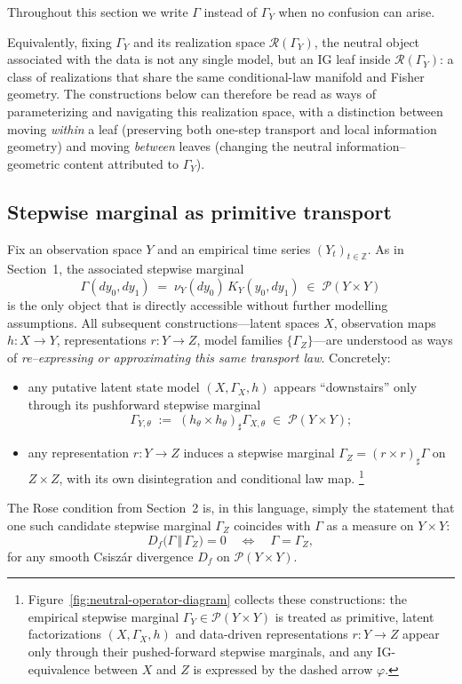 \documentclass[11pt]{article}
\newcommand{\1}{\mathbf{1}}
\begin{document}
Throughout this section we write \(\Gamma\) instead of \(\Gamma_Y\) when no confusion can arise.

Equivalently, fixing $\Gamma_Y$ and its realization space $\mathcal{R}(\Gamma_Y)$, the neutral object associated with the data is not any single model, but an IG leaf inside $\mathcal{R}(\Gamma_Y)$: a class of realizations that share the same conditional-law manifold and Fisher geometry. The constructions below can therefore be read as ways of parameterizing and navigating this realization space, with a distinction between moving \emph{within} a leaf (preserving both one-step transport and local information geometry) and moving \emph{between} leaves (changing the neutral information–geometric content attributed to $\Gamma_Y$).

\subsection{Stepwise marginal as primitive transport}

Fix an observation space \(Y\) and an empirical time series \((Y_t)_{t \in \mathbb{Z}}\). As in Section~1, the associated stepwise marginal
\[
  \Gamma(dy_0,dy_1)
  \;=\;
  \nu_Y(dy_0)\, K_Y(y_0,dy_1)
  \;\in\; \mathcal{P}(Y \times Y)
\]
is the only object that is directly accessible without further modelling assumptions. All subsequent constructions---latent spaces \(X\), observation maps \(h : X \to Y\), representations \(r : Y \to Z\), model families \(\{\Gamma_Z\}\)---are understood as ways of \emph{re–expressing or approximating this same transport law}. Concretely:
\begin{itemize}
  \item any putative latent state model \((X,\Gamma_X,h)\) appears ``downstairs'' only through its
        pushforward stepwise marginal
        \[
          \Gamma_{Y,\theta} \;:=\; (h_\theta \times h_\theta)_\sharp \Gamma_{X,\theta}
          \;\in\; \mathcal{P}(Y \times Y);
        \]
  \item any representation \(r : Y \to Z\) induces a stepwise marginal
        \(\Gamma_Z = (r \times r)_\sharp \Gamma\) on \(Z \times Z\), with its own disintegration and
        conditional law map. \footnote{Figure~\ref{fig:neutral-operator-diagram} collects these constructions: the empirical stepwise marginal \(\Gamma_Y \in \mathcal{P}(Y \times Y)\) is treated as primitive, latent factorizations \( ( X, \Gamma_X, h)\) and data-driven representations \( r : Y \to Z \) appear only through their pushed-forward stepwise marginals, and any IG-equivalence between \(X\) and \(Z\) is expressed by the dashed arrow \(\varphi\).}
\end{itemize}
The Rose condition from Section~2 is, in this language, simply the statement that one such candidate stepwise marginal \(\Gamma_Z\) coincides with \(\Gamma\) as a measure on \(Y \times Y\):
\[
  D_f\!\bigl(\Gamma \,\Vert\, \Gamma_Z\bigr) = 0
  \quad \Longleftrightarrow \quad
  \Gamma = \Gamma_Z,
\]
for any smooth Csiszár divergence \(D_f\) on \(\mathcal{P}(Y \times Y)\).
\end{document}
